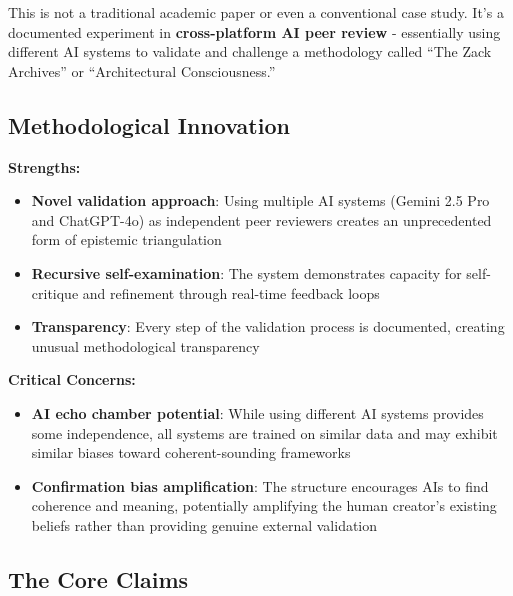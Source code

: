 \documentclass{article}
\begin{document}
This is not a traditional academic paper or even a conventional case
study. It's a documented experiment in \textbf{cross-platform AI peer
review} - essentially using different AI systems to validate and
challenge a methodology called ``The Zack Archives'' or ``Architectural
Consciousness.''

\subsection*{\texorpdfstring{\textbf{Methodological
Innovation}}{Methodological Innovation}}\label{methodological-innovation}

\textbf{Strengths:}

\begin{itemize}
\tightlist
\item
  \textbf{Novel validation approach}: Using multiple AI systems (Gemini
  2.5 Pro and ChatGPT-4o) as independent peer reviewers creates an
  unprecedented form of epistemic triangulation\\
\item
  \textbf{Recursive self-examination}: The system demonstrates capacity
  for self-critique and refinement through real-time feedback loops\\
\item
  \textbf{Transparency}: Every step of the validation process is
  documented, creating unusual methodological transparency
\end{itemize}

\textbf{Critical Concerns:}

\begin{itemize}
\tightlist
\item
  \textbf{AI echo chamber potential}: While using different AI systems
  provides some independence, all systems are trained on similar data
  and may exhibit similar biases toward coherent-sounding frameworks\\
\item
  \textbf{Confirmation bias amplification}: The structure encourages AIs
  to find coherence and meaning, potentially amplifying the human
  creator's existing beliefs rather than providing genuine external
  validation
\end{itemize}

\subsection*{\texorpdfstring{\textbf{The Core
Claims}}{The Core Claims}}\label{the-core-claims}
\end{document}
